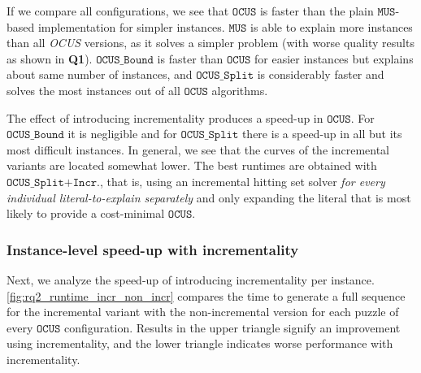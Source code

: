 \documentclass[twoside,11pt]{article}
\newcommand\comment[1]{\marginpar{\tiny #1}}
\renewcommand\comment[1]{#1}
\newcommand{\tias}[1]{{\comment{\color{blue}Tias:#1}}}
\newcommand{\emilio}[1]{{\comment{\color{red}Emilio: #1}}}
\newcommand\mm[1]{\ensuremath{#1}\xspace}
\newcommand\call[1]{\mm{\texttt{#1}}}
\newcommand\comus{\mm{\call{OCUS}}}
\newcommand\mus{\mm{\call{MUS}}}
\newcommand{\comusbound}{\mm{\call{OCUS\_Bound}}}
\newcommand{\comussplit}{\mm{\call{OCUS\_Split}}}
\newcommand\ousbiterincr{\mm{\call{OCUS\_Split+Incr.}}}
\begin{document}


If we compare all configurations, we see that \comus is faster than the plain \mus-based implementation for simpler instances. \mus is able to explain more instances than all \emph{OCUS} versions, as it solves a simpler problem (with worse quality results as shown in \textbf{Q1}).
\comusbound is faster than \comus for easier instances but explains about same number of instances, and \comussplit is considerably faster and solves the most instances out of all \comus algorithms.

The effect of introducing incrementality produces a speed-up in \comus. For \comusbound it is negligible and for \comussplit there is a speed-up in all but its most difficult instances.
In general, we see that the curves of the incremental variants are located somewhat lower.
The best runtimes are obtained with \ousbiterincr, that is, using an incremental hitting set solver \emph{for every individual literal-to-explain separately} and only expanding the literal that is most likely to provide a cost-minimal \comus.

\subsubsection{Instance-level speed-up with incrementality} Next, we analyze the speed-up of introducing incrementality per instance. \cref{fig:rq2_runtime_incr_non_incr} compares the time to generate a full sequence for the incremental variant with the non-incremental version for each puzzle of every \comus configuration. Results in the upper triangle signify an improvement using incrementality, and the lower triangle indicates worse performance with incrementality.
\end{document}

